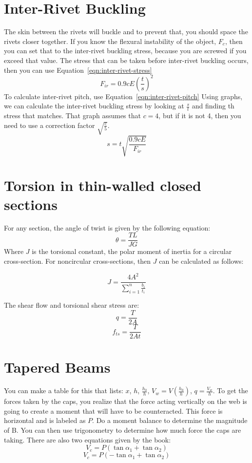\documentclass{article}
\begin{document}
\section{Inter-Rivet Buckling}
The skin between the rivets will buckle and to prevent that, you should space the rivets closer together.
If you know the flexural instability of the object, $F_c$, then you can set that to the inter-rivet buckling stress, because you are screwed if you exceed that value.
The stress that can be taken before inter-rivet buckling occurs, then you can use Equation~\ref{eqn:inter-rivet-stress}
\begin{equation}\label{eqn:inter-rivet-stress}
    F_{ir} = 0.9cE\left(\frac{t}{s}\right) ^ 2
\end{equation}
To calculate inter-rivet pitch, use Equation~\ref{eqn:inter-rivet-pitch}
Using graphs, we can calculate the inter-rivet buckling stress by looking at $\frac{s}{t}$ and finding th stress that matches.
That graph assumes that $c=4$, but if it is not 4, then you need to use a correction factor $\sqrt{\frac{c}{5}}$.
\begin{equation}\label{eqn:inter-rivet-pitch}
   s = t\sqrt{\frac{0.9cE}{F_{ir}}} 
\end{equation}
\section{Torsion in thin-walled closed sections}
For any section, the angle of twist is given by the following equation:
\begin{equation}
\theta = \frac{TL}{JG}
\end{equation}
Where $J$ is the torsional constant, the polar moment of inertia for a circular cross-section.
For noncircular cross-sections, then $J$ can be calculated as follows:

\begin{equation}
    J = \frac{4A^2}{\sum_{i=1}^n\frac{b_i}{t_i}}
\end{equation}

The shear flow and torsional shear stress are:
\begin{equation}
    q = \frac{T}{2A}
\end{equation}
\begin{equation}
    f_{ts} = \frac{T}{2At}
\end{equation}
\section{Tapered Beams}
You can make a table for this that lists: $x$, $h$, $\frac{h_0}{h}$, $V_w = V(\frac{h_0}{h})$, $q =  \frac{V_w}{h}$.
To get the forces taken by the caps, you realize that the force acting vertically on the web is going to create a moment that will have to be counteracted.
This force is horizontal and is labeled as $P$.
Do a moment balance to determine the magnitude of B.
You can then use trigonometry to determine how much force the caps are taking.
There are also two equations given by the book:
\begin{equation}
    V_c = P(\tan\alpha_1 + \tan\alpha_2)
\end{equation}
\begin{equation}
    V_c = P(-\tan\alpha_1 + \tan\alpha_2)
\end{equation}
\end{document}
